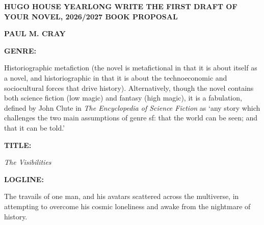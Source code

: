 \ifx\fontfam\undefined
\else
  \fontfam[LM]
  \def\sl{\slant\it}
\fi

\enlang {}
\hyperlinks{}{}

\parindent=0pt

{\bf HUGO HOUSE YEARLONG WRITE THE FIRST DRAFT OF YOUR NOVEL, 2026/2027 BOOK PROPOSAL}\par 
\bigskip

{\bf PAUL M. CRAY}\par 
\bigskip

{\bf GENRE:}\par
Historiographic metafiction (the novel is metafictional in that it is about itself as a novel, and historiographic in that it is about the technoeconomic and sociocultural forces that drive history). Alternatively, though the novel contains both science fiction (low magic) and fantasy (high magic), it is a fabulation, defined by John Clute in {\sl The Encyclopedia of Science Fiction} as ‘any story which challenges the two main assumptions of genre sf: that the world can be seen; and that it can be told.’\par
\bigskip

{\bf TITLE:}\par
{\sl The Visibilities}\par
\bigskip

{\bf LOGLINE:}\par
The travails of one man, and his avatars scattered across the multiverse, in attempting to overcome his cosmic loneliness and awake from the nightmare of history.\par
\bigskip


